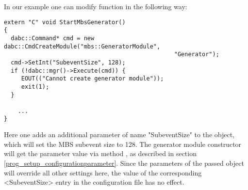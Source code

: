 In our example one can modify  function in the following way:
\begin{verbatim}
extern "C" void StartMbsGenerator() 
{
  dabc::Command* cmd = new dabc::CmdCreateModule("mbs::GeneratorModule", 
                                                 "Generator");
  cmd->SetInt("SubeventSize", 128);
  if (!dabc::mgr()->Execute(cmd)) {
     EOUT(("Cannot create generator module"));
     exit(1);
  }
    
    ...
}
\end{verbatim}

Here one adds an additional parameter of name "SubeventSize" to
the  object, 
which will set the MBS subevent size to 128. 
The generator module constructor will get the parameter value via method
, as described in section \ref{prog_setup_configurationparameter}.
Since the parameters of the passed  object will override all other settings here,
the value of the corresponding <SubeventSize> entry in the configuration file has no effect.

